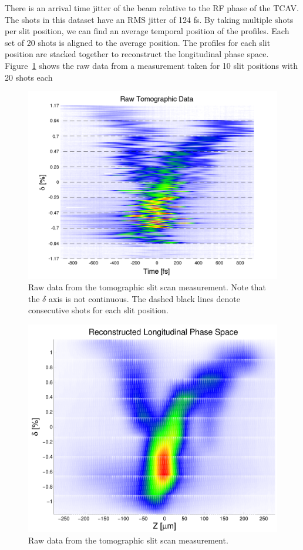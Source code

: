 \documentclass[%
twocolumn,
showpacs,preprintnumbers,
 aps,
prstab,
]{revtex4-1}
\begin{document}
There is an arrival time jitter of the beam relative to the RF phase of the TCAV. The shots in this dataset have an RMS jitter of 124 fs. By taking multiple shots per slit position, we can find an average temporal position of the profiles. Each set of 20 shots is aligned to the average position. The profiles for each slit position are stacked together to reconstruct the longitudinal phase space. Figure~\ref{raw_data} shows the raw data from a measurement taken for 10 slit positions with 20 shots each

\begin{figure}[hbt]
  \includegraphics[width=\columnwidth]{figures/raw.pdf}
  \caption{Raw data from the tomographic slit scan measurement. Note that the $\delta$ axis is not continuous. The dashed black lines denote consecutive shots for each slit position.}
  \label{raw_data}
\end{figure}

\begin{figure}[hbt]
  \includegraphics[width=\columnwidth]{figures/test.pdf}
  \caption{Raw data from the tomographic slit scan measurement.}
  \label{ps}
\end{figure}
\end{document}
